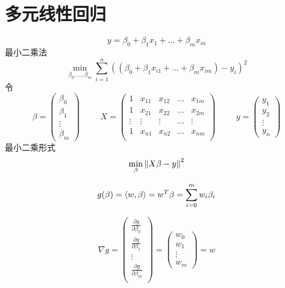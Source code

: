 \documentclass[11pt]{article}
\begin{document}
\section{多元线性回归}
\label{sec:orgf3b11c6}
\begin{equation*}
y=\beta_0+\beta_1x_1+\dots+\beta_mx_m
\end{equation*}
最小二乘法
\begin{equation*}
\min_{\beta_0,\dots,\beta_m}\sum_{i=1}^n((\beta_0+\beta_1x_{i1}+\dots+\beta_mx_{im})-y_i)^2
\end{equation*}
令
\begin{equation*}
\beta=
\begin{pmatrix}
\beta_0\\\beta_1\\\vdots\\\beta_m
\end{pmatrix}\hspace{1cm}
X=
\begin{pmatrix}
1&x_{11}&x_{12}&\dots&x_{1m}\\
1&x_{21}&x_{22}&\dots&x_{2m}\\
\vdots&\vdots&\vdots&\dots&\vdots\\
1&x_{n1}&x_{n2}&\dots&x_{nm}\\
\end{pmatrix}\hspace{1cm}
y=
\begin{pmatrix}
y_1\\y_2\\\vdots\\y_n
\end{pmatrix}
\end{equation*}
最小二乘形式
\begin{equation*}
\min_{\beta}\left\lVert X\beta-y\right\rVert^2
\end{equation*}

\begin{equation*}
g(\beta)=\langle w,\beta\rangle=w^T\beta=\sum_{i=0}^mw_i\beta_i
\end{equation*}

\begin{equation*}
\nabla g=
\begin{pmatrix}
\frac{\partial g}{\partial \beta_0}\\
\frac{\partial g}{\partial \beta_1}\\
\vdots\\
\frac{\partial g}{\partial \beta_m}\\
\end{pmatrix}=
\begin{pmatrix}
w_0\\w_1\\\vdots\\w_m
\end{pmatrix}=w
\end{equation*}
\end{document}
